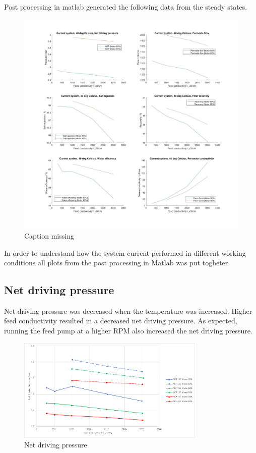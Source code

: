 \newpage

Post processing in matlab generated the following data from the steady states.

\begin{figure}[H]
    \centering
    \includegraphics[width=1.1\textwidth]{Key40}
    \caption{Caption missing}
    \label{fig:PressConn}
\end{figure}

\newpage

In order to understand how the system current performed in different working conditions all plots from the post processing in Matlab was put togheter. 

\subsection{Net driving pressure}

Net driving pressure was decreased when the temperature was increased. Higher feed conductivity resulted in a decreased net driving pressure. As expected, running the feed pump at a higher RPM also increased the net driving pressure.

\begin{figure}[H]
    \centering
    \includegraphics[width=0.8\textwidth]{NDP}
    \caption{Net driving pressure}
    \label{fig:PressConn}
\end{figure}

